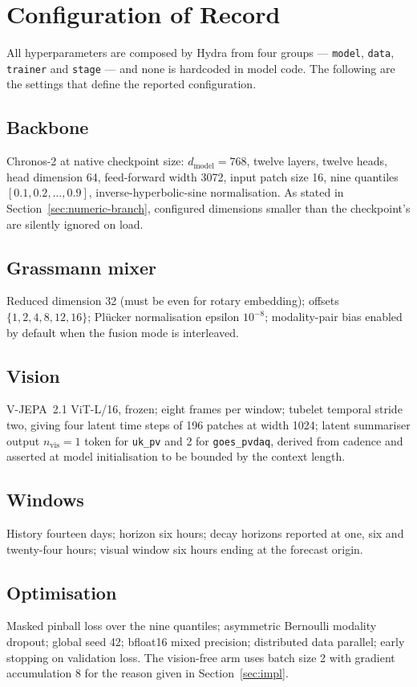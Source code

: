 \chapter{Configuration of Record}
\label{app:config}

All hyperparameters are composed by Hydra from four groups --- \texttt{model}, \texttt{data},
\texttt{trainer} and \texttt{stage} --- and none is hardcoded in model code. The following are
the settings that define the reported configuration.

\section{Backbone}
Chronos-2 at native checkpoint size: $d_{\text{model}}=768$, twelve layers, twelve heads,
head dimension 64, feed-forward width 3072, input patch size 16, nine quantiles
$[0.1, 0.2, \ldots, 0.9]$, inverse-hyperbolic-sine normalisation. As stated in
Section~\ref{sec:numeric-branch}, configured dimensions smaller than the checkpoint's are
silently ignored on load.

\section{Grassmann mixer}
Reduced dimension 32 (must be even for rotary embedding); offsets $\{1,2,4,8,12,16\}$;
Pl\"ucker normalisation epsilon $10^{-8}$; modality-pair bias enabled by default when the
fusion mode is interleaved.

\section{Vision}
V-JEPA~2.1 ViT-L/16, frozen; eight frames per window; tubelet temporal stride two, giving
four latent time steps of 196 patches at width 1024; latent summariser output
$n_{\text{vis}}=1$ token for \texttt{uk\_pv} and 2 for \texttt{goes\_pvdaq}, derived from
cadence and asserted at model initialisation to be bounded by the context length.

\section{Windows}
History fourteen days; horizon six hours; decay horizons reported at one, six and
twenty-four hours; visual window six hours ending at the forecast origin.

\section{Optimisation}
Masked pinball loss over the nine quantiles; asymmetric Bernoulli modality dropout; global
seed 42; bfloat16 mixed precision; distributed data parallel; early stopping on validation
loss. The vision-free arm uses batch size 2 with gradient accumulation 8 for the reason given
in Section~\ref{sec:impl}.


